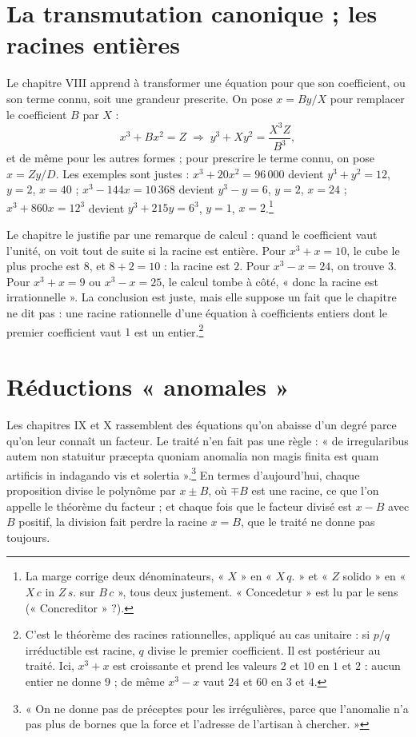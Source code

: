 \documentclass[11pt,a4paper]{article}
\begin{document}
\section*{La transmutation canonique ; les racines entières}

Le chapitre VIII apprend à transformer une équation pour que son coefficient,
ou son terme connu, soit une grandeur prescrite. On pose $x = By/X$ pour
remplacer le coefficient $B$ par $X$ :
\[ x^3 + Bx^2 = Z \;\Longrightarrow\; y^3 + Xy^2 = \frac{X^3 Z}{B^3} , \]
et de même pour les autres formes ; pour prescrire le terme connu, on pose
$x = Zy/D$. Les exemples sont justes : $x^3 + 20x^2 = 96\,000$ devient
$y^3 + y^2 = 12$, $y = 2$, $x = 40$ ; $x^3 - 144x = 10\,368$ devient $y^3 - y = 6$,
$y = 2$, $x = 24$ ; $x^3 + 860x = 12^3$ devient $y^3 + 215y = 6^3$, $y = 1$,
$x = 2$.\footnote{La marge corrige deux dénominateurs, « $X$ » en « $X\,q.$ » et
« $Z$ solido » en « $X\,c$ in $Z\,s.$ sur $B\,c$ », tous deux justement. « Concedetur »
est lu par le sens (« Concreditor » ?).}

Le chapitre le justifie par une remarque de calcul : quand le coefficient vaut
l'unité, on voit tout de suite si la racine est entière. Pour $x^3 + x = 10$, le
cube le plus proche est $8$, et $8 + 2 = 10$ : la racine est $2$. Pour
$x^3 - x = 24$, on trouve $3$. Pour $x^3 + x = 9$ ou $x^3 - x = 25$, le calcul
tombe à côté, « donc la racine est irrationnelle ». La conclusion est juste,
mais elle suppose un fait que le chapitre ne dit pas : une racine rationnelle
d'une équation à coefficients entiers dont le premier coefficient vaut $1$ est
un entier.\footnote{C'est le théorème des racines rationnelles, appliqué au
cas unitaire : si $p/q$ irréductible est racine, $q$ divise le premier
coefficient. Il est postérieur au traité. Ici, $x^3 + x$ est croissante et prend
les valeurs $2$ et $10$ en $1$ et $2$ : aucun entier ne donne $9$ ; de même
$x^3 - x$ vaut $24$ et $60$ en $3$ et $4$.}

\section*{Réductions « anomales »}

Les chapitres IX et X rassemblent des équations qu'on abaisse d'un degré parce
qu'on leur connaît un facteur. Le traité n'en fait pas une règle : « de
irregularibus autem non statuitur præcepta quoniam anomalia non magis finita
est quam artificis in indagando vis et solertia ».\footnote{« On ne donne pas de
préceptes pour les irrégulières, parce que l'anomalie n'a pas plus de bornes que
la force et l'adresse de l'artisan à chercher. »} En termes d'aujourd'hui, chaque
proposition divise le polynôme par $x \pm B$, où $\mp B$ est une racine, ce que
l'on appelle le théorème du facteur ; et chaque fois que le facteur divisé est
$x - B$ avec $B$ positif, la division fait perdre la racine $x = B$, que le
traité ne donne pas toujours.
\end{document}
